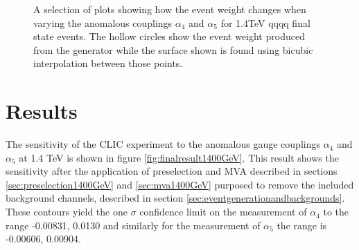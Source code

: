 \begin{figure}
\caption[Event weights from Whizard for 1.4TeV \nu{\nu}qqqq final state events with interpolated surface.]{A selection of plots showing how the event weight changes when varying the anomalous couplings $\alpha_{4}$ and $\alpha_{5}$ for 1.4TeV \nu{\nu}qqqq final state events.  The hollow circles show the event weight produced from the generator while the surface shown is found using bicubic interpolation between those points.}
\label{fig:eventweights1400interpolated}
\end{figure}


\section{Results}
The sensitivity of the CLIC experiment to the anomalous gauge couplings $\alpha_{4}$ and $\alpha_{5}$ at 1.4 TeV is shown in figure \ref{fig:finalresult1400GeV}.  This result shows the sensitivity after the application of preselection and MVA described in sections \ref{sec:preselection1400GeV} and \ref{sec:mva1400GeV} purposed to remove the included background channels, described in section \ref{sec:eventgenerationandbackgrounds}.  These contours yield the one $\sigma$ confidence limit on the measurement of $\alpha_{4}$ to the range -0.00831, 0.0130 and similarly for the measurement of $\alpha_{5}$ the range is -0.00606, 0.00904.


